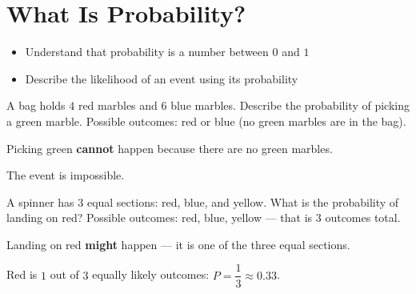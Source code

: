 \section{What Is Probability?}

\begin{stepGoal}
\begin{itemize}
    \item Understand that probability is a number between $0$ and $1$
    \item Describe the likelihood of an event using its probability
\end{itemize}
\end{stepGoal}

\begin{stepVocabBox}
\end{stepVocabBox}

\begin{stepsCard}
\end{stepsCard}

\begin{stepExample}{A bag holds $4$ red marbles and $6$ blue marbles. Describe the probability of picking a green marble.}
     Possible outcomes: red or blue (no green marbles are in the bag).

     Picking green \textbf{cannot} happen because there are no green marbles.

     The event is impossible.
\end{stepExample}

\begin{stepExample}{A spinner has $3$ equal sections: red, blue, and yellow. What is the probability of landing on red?}
     Possible outcomes: red, blue, yellow --- that is $3$ outcomes total.

     Landing on red \textbf{might} happen --- it is one of the three equal sections.

     Red is $1$ out of $3$ equally likely outcomes: $P = \dfrac{1}{3} \approx 0.33$.
\end{stepExample}


